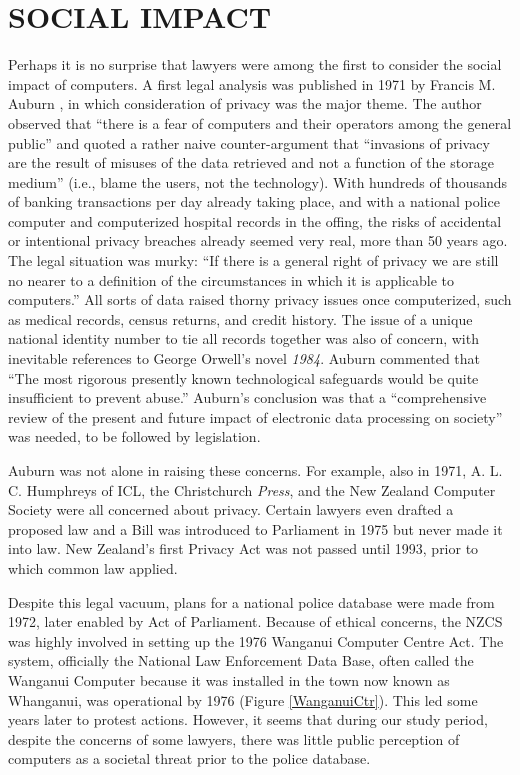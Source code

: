 \documentclass{IEEEcsmag}
\begin{document}
\vspace*{-8pt}
\section{SOCIAL IMPACT}

Perhaps it is no surprise that lawyers were among the first to consider the social impact of computers.
A first legal analysis was published in 1971 by Francis M. Auburn \cite{Auburn1971}, in which consideration of privacy
was the major theme. The author observed that “there is a fear of computers and their operators among the
general public” and quoted a rather naive counter-argument that “invasions of privacy are the result of misuses
of the data retrieved and not a function of the storage medium” (i.e., blame the users, not the technology).
With hundreds of thousands of banking transactions per day already taking place, and with a national police
computer and computerized hospital records in the offing, the risks of accidental or intentional privacy breaches
already seemed very real, more than 50 years ago. The legal situation was murky: “If there is a general right of
privacy we are still no nearer to a definition of the circumstances in which it is applicable to computers.” All sorts
of data raised thorny privacy issues once computerized, such as medical records, census returns, and credit history.
The issue of a unique national identity number to tie all records together was also of concern, with
inevitable references to George Orwell’s novel \textit{1984}. Auburn commented that “The most
rigorous presently known technological safeguards would be quite insufficient to
prevent abuse.” Auburn’s conclusion was that a “comprehensive review of the present and future
impact of electronic data processing on society” was needed, to be followed by legislation.

Auburn was not alone in raising these concerns. For example, also in 1971, A. L. C. Humphreys of ICL, the Christchurch
\textit{Press}, and the New Zealand Computer Society were all concerned about privacy. Certain lawyers
even drafted a proposed law \cite{Press-privacy-1971} and a Bill was introduced to Parliament in 1975
\cite{Press-privacy-1975} but never made it into law.
New Zealand’s first Privacy Act was not passed until 1993, prior to which common law applied.

Despite this legal vacuum, plans for a national police database were made from 1972, later enabled by Act of Parliament.
Because of ethical concerns,  the NZCS was highly involved in setting up the 1976 Wanganui Computer Centre Act.
The system, officially the National Law Enforcement Data Base, often called the Wanganui Computer because
it was installed in the town now known as Whanganui, was operational by 1976 (Figure \ref{WanganuiCtr}).
This led some years later to protest actions. However, it seems that during our study period,
despite the concerns of some lawyers, there was little public perception of computers as a societal
threat prior to the police database.
\end{document}
